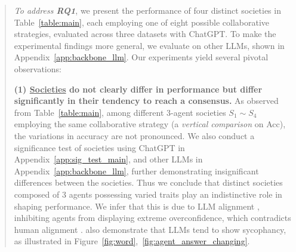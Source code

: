 \documentclass[11pt]{article}
\begin{document}
\begin{abstract}
\emph{To address \textbf{RQ1}}, 
we present the performance of four distinct societies in Table~\ref{table:main}, each employing one of eight possible collaborative strategies, evaluated across three datasets with ChatGPT. 
To make the experimental findings more general, we evaluate on other LLMs, shown in Appendix~\ref{app:backbone_llm}. 
Our experiments yield several pivotal observations: 

\vspace{2.5mm}
\textbf{
(1) 
\underline{Societies} do not clearly differ in performance but differ significantly in their tendency to reach a consensus.
} 
As observed from Table~\ref{table:main}, among different 3-agent societies $S_1 \sim S_4$ employing the same collaborative strategy (a \emph{vertical comparison} on Acc), the variations in accuracy are not pronounced. 
We also conduct a significance test of societies using ChatGPT in Appendix~\ref{app:sig_test_main}, and other LLMs in Appendix~\ref{app:backbone_llm}, further demonstrating insignificant differences between the societies. 
Thus we conclude that distinct societies composed of 3 agents possessing varied traits play an indistinctive role in shaping performance. 
We infer that this is due to LLM alignment \citep{NeurIPS2022_InstructGPT}, inhibiting agents from displaying extreme overconfidence, which contradicts human alignment \citep{NAACL2022-Findings_Align-GLMs}. \citet{ICLR2024_Sycophancy-LLM} also demonstrate that LLMs tend to show sycophancy, as illustrated in Figure~\ref{fig:word},~\ref{fig:agent_answer_changing}. 

\end{abstract}
\end{document}

